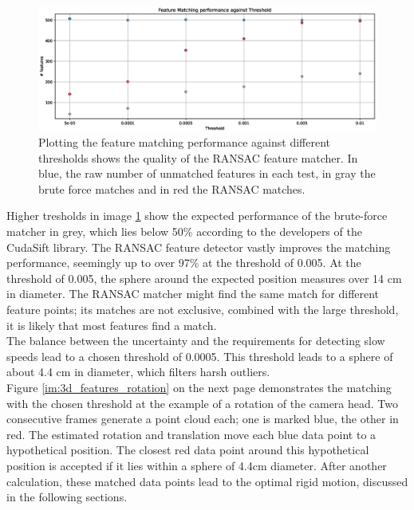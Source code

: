 \begin{figure}[H]
    \centering
    \includegraphics[width=1.0\textwidth]{images/noise_against_threshold.eps}
    \caption{Plotting the feature matching performance against different thresholds shows the quality of the RANSAC feature matcher. In blue, the raw number of unmatched features in each test, in gray the brute force matches and in red the RANSAC matches.}
    \label{im:noise_against_thresh}
\end{figure}
Higher tresholds in image \ref{im:noise_against_thresh} show the expected performance of the brute-force matcher in grey, which lies below 50\% according to the developers of the CudaSift library.\cite{cudaSiftRepo} The RANSAC feature detector vastly improves the matching performance, seemingly up to over 97\% at the threshold of 0.005. At the threshold of 0.005, the sphere around the expected position measures over 14 cm in diameter. The RANSAC matcher might find the same match for different feature points; its matches are not exclusive, combined with the large threshold, it is likely that most features find a match.\\
The balance between the uncertainty and the requirements for detecting slow speeds lead to a chosen threshold of 0.0005. This threshold leads to a sphere of about 4.4 cm in diameter, which filters harsh outliers.\\ 
Figure \ref{im:3d_features_rotation} on the next page demonstrates the matching with the chosen threshold at the example of a rotation of the camera head. Two consecutive frames generate a point cloud each; one is marked blue, the other in red. The estimated rotation and translation move each blue data point to a hypothetical position. The closest red data point around this hypothetical position is accepted if it lies within a sphere of 4.4cm diameter. 
After another calculation, these matched data points lead to the optimal rigid motion, discussed in the following sections.

